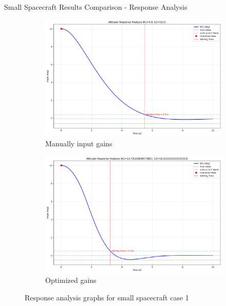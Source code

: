 \documentclass{beamer}
\begin{document}
\begin{frame}{Small Spacecraft Results Comparison - Response Analysis}
    \begin{figure}[H]
    \label{Fig. 1}
    \centering
    \begin{subfigure}[b]{0.48\columnwidth}
        \label{Fig. 1.A}
        \centering
        \includegraphics[width=\linewidth]{base_analysis(4).pdf}
        \caption{Manually input gains}
        \label{fig:subfig1}
    \end{subfigure}
    \hfill
    \begin{subfigure}[b]{0.48\columnwidth}
        \label{Fig. 1.B}
        \centering
        \includegraphics[width=\linewidth]{best_analysis(4).pdf}
        \caption{Optimized gains}
        \label{fig:subfig2}
    \end{subfigure}
    \caption{Response analysis graphs for small spacecraft case 1}
    \label{fig:combined}
\end{figure}
\end{frame}
\end{document}
